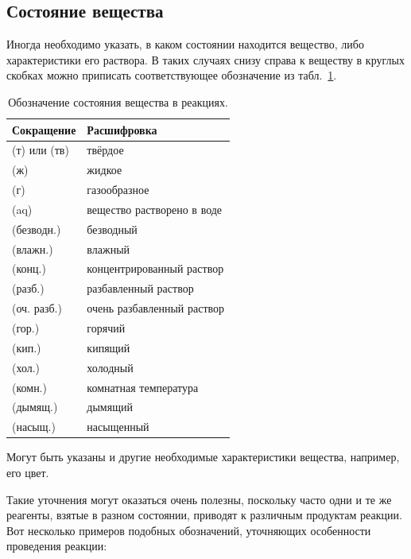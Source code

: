 \subsection*{Состояние вещества}

Иногда необходимо указать, в каком состоянии находится вещество, либо характеристики его раствора. В таких случаях снизу справа к веществу в круглых скобках можно приписать соответствующее обозначение из табл.~\ref{tab:designation_of_the_state_of_matter}.

\begin{table}[htbp]
    \small
    \caption{Обозначение состояния вещества в реакциях.}
    \label{tab:designation_of_the_state_of_matter}
    \centering
    \begin{tabular}{ll}
        \hline
        \rowcolor{table_header}Сокращение & Расшифровка \\
        \hline
        (т) или (тв) & твёрдое \\
        (ж) & жидкое \\
        (г) & газообразное \\
        \hline
        (aq) & вещество растворено в воде \\
        (безводн.) & безводный \\
        (влажн.) & влажный \\
        (конц.) & концентрированный раствор \\
        (разб.) & разбавленный раствор \\
        (оч. разб.) & очень разбавленный раствор \\
        \hline
        (гор.) & горячий \\
        (кип.) & кипящий \\
        (хол.) & холодный \\
        (комн.) & комнатная температура \\
        \hline
        (дымящ.) & дымящий \\
        (насыщ.) & насыщенный \\
        \hline
    \end{tabular}
\end{table}

Могут быть указаны и другие необходимые характеристики вещества, например, его цвет.

Такие уточнения могут оказаться очень полезны, поскольку часто одни и те же реагенты, взятые в разном состоянии, приводят к различным продуктам реакции. Вот несколько примеров подобных обозначений, уточняющих особенности проведения реакции:


